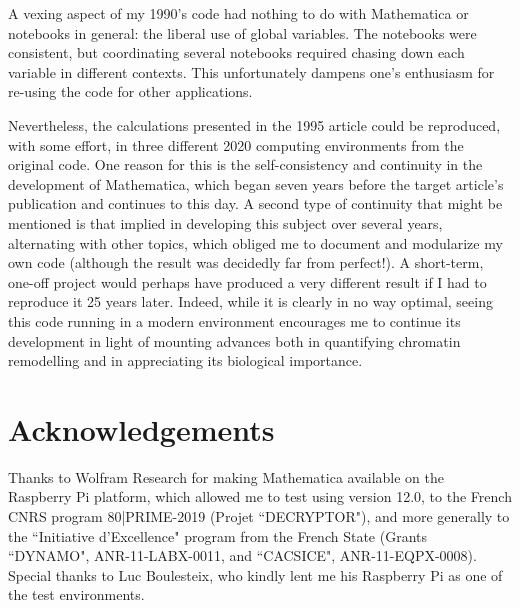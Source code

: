 A vexing aspect of my 1990's code had nothing to do with Mathematica or notebooks in general: the liberal use of global variables. The notebooks were consistent, but coordinating several notebooks required chasing down each variable in different contexts. This unfortunately dampens one's enthusiasm for re-using the code for other applications.

Nevertheless, the calculations presented in the 1995 article could be reproduced, with some effort, in three different 2020 computing environments from the original code. One reason for this is the self-consistency and continuity in the development of Mathematica, which began seven years before the target article's publication and continues to this day. A second type of continuity that might be mentioned is that implied in developing this subject over several years, alternating with other topics, which obliged me to document and modularize my own code (although the result was decidedly far from perfect!). A short-term, one-off project would perhaps have produced a very different result if I had to reproduce it 25 years later. Indeed, while it is clearly in no way optimal, seeing this code running in a modern environment encourages me to continue its development in light of mounting advances both in quantifying chromatin remodelling and in appreciating its biological importance.


\section{Acknowledgements}
Thanks to Wolfram Research for making Mathematica available on the Raspberry Pi platform, which allowed me to test using version 12.0, to the French CNRS program 80|PRIME-2019 (Projet ``DECRYPTOR"), and more generally to the ``Initiative d'Excellence" program from  the French State (Grants ``DYNAMO", ANR-11-LABX-0011, and ``CACSICE", ANR-11-EQPX-0008). Special thanks to Luc Boulesteix, who kindly lent me his Raspberry Pi as one of the test environments.

%
